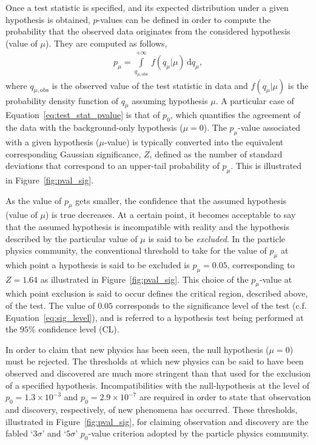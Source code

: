 Once a test statistic is specified, and its expected distribution under a given hypothesis is obtained,
$p$-values can be defined in order to compute the probability that the observed data originates from the
considered hypothesis (value of $\mu$).
They are computed as follows,
\begin{align}
    p_{\mu} = \int\limits_{q_{\mu, \text{obs}}}^{+\infty} \, f(q_{\mu} | \mu) \, \mathrm{d}q_{\mu},
    \label{eq:test_stat_pvalue}
\end{align}
where $q_{\mu, \text{obs}}$ is the observed value of the test statistic in data and $f(q_{\mu} | \mu)$ is the probability
density function of $q_{\mu}$ assuming hypothesis $\mu$.
A particular case of Equation~\ref{eq:test_stat_pvalue} is that of $p_0$, which quantifies the agreement of the data with the background-only
hypothesis ($\mu = 0$).
The $p_{\mu}$-value associated with a given hypothesis ($\mu$-value) is typically converted into the equivalent corresponding Gaussian significance, $Z$, defined
as the number of standard deviations that correspond to an upper-tail probability of $p_{\mu}$.
This is illustrated in Figure~\ref{fig:pval_sig}.

As the value of $p_{\mu}$ gets smaller, the confidence that the assumed hypothesis (value of $\mu$) is true
decreases.
At a certain point, it becomes acceptable to say that the assumed hypothesis is incompatible with
reality and the hypothesis described by the particular value of $\mu$ is said to be \textit{excluded}.
In the particle physics community, the conventional threshold to take for the value of $p_{\mu}$
at which point a hypothesis is said to be excluded is $p_{\mu} = 0.05$, corresponding to $Z=1.64$ as
illustrated in Figure~\ref{fig:pval_sig}.
This choice of the $p_{\mu}$-value at which point exclusion is said to occur defines
the critical region, described above, of the test.
The value of $0.05$ corresponds to the significance level of the test (c.f. Equation~\ref{eq:sig_level}), and is referred
to a hypothesis test being performed at the $95\%$ confidence level (CL).

In order to claim that new physics has been seen, the null hypothesis ($\mu = 0$) must be rejected.
The thresholds at which new physics can be said to have been observed and discovered are
much more stringent than that used for the exclusion of a specified hypothesis.
Incompatibilities with the null-hypothesis at the level of $p_0 = 1.3 \times 10^{-3}$ and
$p_0 = 2.9\times 10^{-7}$ are required in order to state that observation and discovery, respectively,
of new phenomena has occurred.
These thresholds, illustrated in Figure~\ref{fig:pval_sig}, for claiming observation and discovery are the fabled `$3\sigma$' and `$5\sigma$'
$p_0$-value criterion adopted by the particle physics community.

